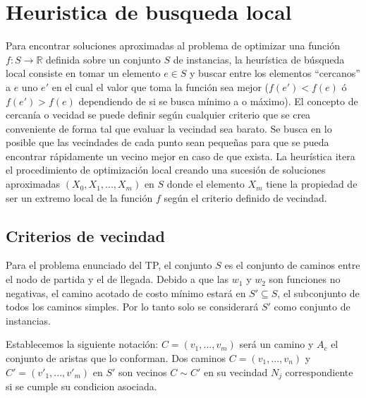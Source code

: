 \section{Heuristica de busqueda local}

Para encontrar soluciones aproximadas al problema de optimizar una funci\'on $f:S \rightarrow \mathbb{R}$ definida sobre un conjunto $S$ de instancias, la heur\'istica de b\'usqueda local consiste en tomar un elemento $e \in S$ y buscar entre los elementos ``cercanos'' a $e$ uno $e'$ en el cual el valor que toma la funci\'on sea mejor ($f(e') < f(e)$ \'o $f(e') > f(e)$ dependiendo de si se busca m\'inimo a o m\'aximo).
El concepto de cercan\'ia o vecidad se puede definir seg\'un cualquier criterio que se crea conveniente de forma tal que evaluar la vecindad sea barato. Se busca en lo posible que las vecindades de cada punto sean peque\~nas para que se pueda encontrar r\'apidamente un vecino mejor en caso de que exista.
La heur\'istica itera el procedimiento de optimizaci\'on local creando una sucesi\'on de soluciones aproximadas $(X_0, X_1, ... , X_m)$ en $S$ donde el elemento $X_m$ tiene la propiedad de ser un extremo local de la funci\'on $f$ seg\'un el criterio definido de vecindad.

\subsection{Criterios de vecindad}
Para el problema enunciado del TP, el conjunto $S$ es el conjunto de caminos entre el nodo de partida y el de llegada. Debido a que las $w_1$ y $w_2$ son funciones no negativas, el camino acotado de costo m\'inimo estar\'a en $S' \subseteq S$, el subconjunto de todos los caminos simples. Por lo tanto solo se considerar\'a $S'$ como conjunto de instancias.

Establecemos la siguiente notaci\'on: $C = (v_1, ..., v_m)$ ser\'a un camino y $A_c$ el conjunto de aristas que lo conforman. Dos caminos $C = (v_1, ... , v_n)$ y $C' = (v'_1, ... , v'_m)$ en $S'$ son vecinos $C \sim C'$ en su vecindad $N_j$ correspondiente si se cumple su condicion asociada.\\

